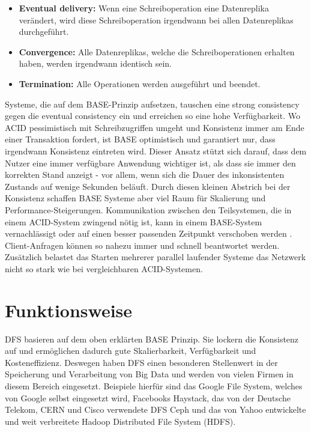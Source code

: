 \documentclass[12pt,oneside,a4paper,parskip]{scrbook}
\begin{document}
\begin{itemize}
  \item \textbf{Eventual delivery:} Wenn eine Schreiboperation eine Datenreplika verändert, wird diese Schreiboperation irgendwann bei allen Datenreplikas durchgeführt.
  \item \textbf{Convergence:} Alle Datenreplikas, welche die Schreiboperationen erhalten haben, werden irgendwann identisch sein.
  \item \textbf{Termination:} Alle Operationen werden ausgeführt und beendet.
\end{itemize}
Systeme, die auf dem BASE-Prinzip aufsetzen, tauschen eine strong consistency gegen die eventual consistency ein und erreichen so eine hohe Verfügbarkeit. Wo ACID pessimistisch mit Schreibzugriffen umgeht und Konsistenz immer am Ende einer Transaktion fordert, ist BASE optimistisch und garantiert nur, dass irgendwann Konsistenz eintreten wird. Dieser Ansatz stützt sich darauf, dass dem Nutzer eine immer verfügbare Anwendung wichtiger ist, als dass sie immer den korrekten Stand anzeigt - vor allem, wenn sich die Dauer des inkonsistenten Zustands auf wenige Sekunden beläuft. Durch diesen kleinen Abstrich bei der Konsistenz schaffen BASE Systeme aber viel Raum für Skalierung und Performance-Steigerungen. Kommunikation zwischen den Teilsystemen, die in einem ACID-System zwingend nötig ist, kann in einem BASE-System vernachlässigt oder auf einen besser passenden Zeitpunkt verschoben werden \cite{clusterBASE}. Client-Anfragen können so nahezu immer und schnell beantwortet werden. Zusätzlich belastet das Starten mehrerer parallel laufender Systeme das Netzwerk nicht so stark wie bei vergleichbaren ACID-Systemen.

\section{Funktionsweise}
DFS basieren auf dem oben erklärten BASE Prinzip. Sie lockern die Konsistenz auf und ermöglichen dadurch gute Skalierbarkeit, Verfügbarkeit und Kosteneffizienz. Deswegen haben DFS einen besonderen Stellenwert in der Speicherung und Verarbeitung von Big Data und werden von vielen Firmen in diesem Bereich eingesetzt. Beispiele hierfür sind das Google File System, welches von Google selbst eingesetzt wird, Facebooks Haystack, das von der Deutsche Telekom, CERN und Cisco verwendete DFS Ceph \cite{ceph} und das von Yahoo entwickelte und weit verbreitete Hadoop Distributed File System (HDFS).
\end{document}
